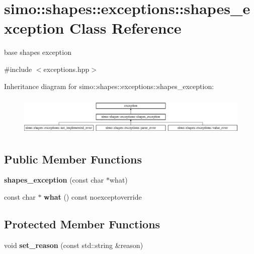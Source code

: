 \hypertarget{classsimo_1_1shapes_1_1exceptions_1_1shapes__exception}{\section{simo\-:\-:shapes\-:\-:exceptions\-:\-:shapes\-\_\-exception Class Reference}
\label{classsimo_1_1shapes_1_1exceptions_1_1shapes__exception}
}


base shapes exception  




{\ttfamily \#include $<$exceptions.\-hpp$>$}

Inheritance diagram for simo\-:\-:shapes\-:\-:exceptions\-:\-:shapes\-\_\-exception\-:\begin{figure}[H]
\begin{center}
\leavevmode
\includegraphics[height=1.917808cm]{classsimo_1_1shapes_1_1exceptions_1_1shapes__exception}
\end{center}
\end{figure}
\subsection*{Public Member Functions}
\begin{DoxyCompactItemize}
\item 
\hypertarget{classsimo_1_1shapes_1_1exceptions_1_1shapes__exception_a42d5526d2f6465814d1e74c4d79f30c1}{{\bfseries shapes\-\_\-exception} (const char $\ast$what)}\label{classsimo_1_1shapes_1_1exceptions_1_1shapes__exception_a42d5526d2f6465814d1e74c4d79f30c1}

\item 
\hypertarget{classsimo_1_1shapes_1_1exceptions_1_1shapes__exception_a61bf1548a63f7df164dbf2812a3fabe3}{const char $\ast$ {\bfseries what} () const noexceptoverride}\label{classsimo_1_1shapes_1_1exceptions_1_1shapes__exception_a61bf1548a63f7df164dbf2812a3fabe3}

\end{DoxyCompactItemize}
\subsection*{Protected Member Functions}
\begin{DoxyCompactItemize}
\item 
\hypertarget{classsimo_1_1shapes_1_1exceptions_1_1shapes__exception_a69e9e832d2b609f810d67f629d36d1ae}{void {\bfseries set\-\_\-reason} (const std\-::string \&reason)}\label{classsimo_1_1shapes_1_1exceptions_1_1shapes__exception_a69e9e832d2b609f810d67f629d36d1ae}

\end{DoxyCompactItemize}


